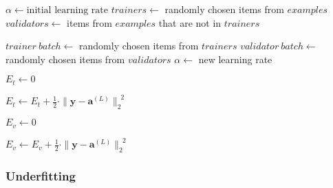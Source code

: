 \documentclass[titlepage]{article}
\begin{document}
      \begin{algorithm}
        \caption{%
          Modified version of algorithm \ref{alglearn} with validation.
        } \label{alglearnval}
        \begin{algorithmic}
            \State $\alpha \gets \text{initial learning rate}$
            \State {}
            \State $trainers \gets$ randomly chosen items from $examples$
            \State $validators \gets$ items from $examples$ that are not in $trainers$

            \Repeat
              \State $trainer\ batch \gets$ randomly chosen items from $trainers$
              \State $validator\ batch \gets$ randomly chosen items from $validators$
              \State {}
              \State {}
              \State {}
              \State {}
              \State $\alpha \gets$ new learning rate
          \EndProcedure

            \State $E_t \gets 0$

              \State {}
              \State {}
              \State $
                E_t \gets
                  E_t
                  +
                  \frac{1}{2}
                  \cdot
                  \| \mathbf{y} - \mathbf{a}^{(L)} \|_2^{\enspace 2}
              $
            \EndFor
          \EndProcedure

            \State $E_v \gets 0$

              \State {}
              \State $
                E_v \gets
                  E_v
                  +
                  \frac{1}{2}
                  \cdot
                  \| \mathbf{y} - \mathbf{a}^{(L)} \|_2^{\enspace 2}
              $
            \EndFor
          \EndProcedure
        \end{algorithmic}
      \end{algorithm}

      \subsubsection{Underfitting}
\end{document}
